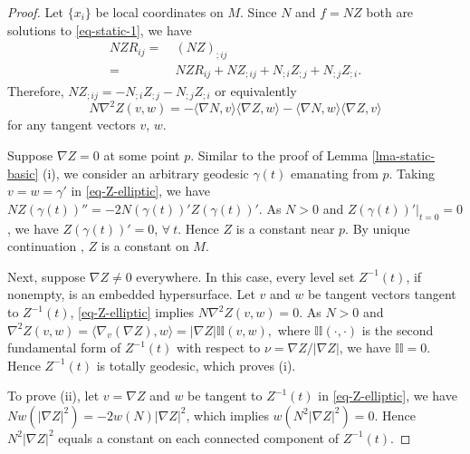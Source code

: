 \documentclass[12pt]{amsart}
\theoremstyle{remark}
\numberwithin{equation}{section}
\newcommand{\be}{\begin{equation}}
\newcommand{\ee}{\end{equation}}
\newcommand{\bee}{\begin{equation*}}
\newcommand{\eee}{\end{equation*}}
\def\la{\langle}
\def\ra{\rangle}
\def\lf{\left}
\def\ri{\right}
\def\Pi{\displaystyle{\mathbb{II}}}
\begin{document}
\begin{proof} Let $ \{ x_i \}$ be local coordinates on $M$.
Since $N$ and $f=NZ$ both are solutions to  \eqref{eq-static-1}, we have
\bee
\begin{split}
NZR_{ij}
=& \ (NZ)_{;ij}\\
=& \ NZR_{ij}+NZ_{;ij}+N_{;i}Z_{;j}+N_{;j}Z_{;i}.
\end{split}
\eee
Therefore,
$ NZ_{;ij}=-N_{;i}Z_{;j}-N_{;j}Z_{;i} $
or equivalently
\be  \label{eq-Z-elliptic}
N \nabla^2 Z (v, w) = - \la \nabla N, v \ra \la \nabla Z, w \ra - \la \nabla N, w \ra \la \nabla Z, v \ra
\ee
for any tangent vectors $v$, $w$.

 Suppose $\nabla Z=0$ at some point $p$. Similar to the proof of Lemma \ref{lma-static-basic} (i),
 we consider an arbitrary geodesic $\gamma(t)$ emanating from $p$.
Taking $ v = w = \gamma'$ in  \eqref{eq-Z-elliptic}, we have
 $  N  Z(\gamma(t) ) '' =  - 2 N (\gamma(t))' Z(\gamma(t))' $.
 As $N > 0 $ and $ Z(\gamma(t))' |_{t=0} = 0 $, we have  $ Z(\gamma(t))' = 0 $, $ \forall \ t $. Hence
$Z$ is a constant near $p$.  By unique continuation \cite{Aronszajn-1957}, $Z$ is  a constant on $M$.


Next, suppose $ \nabla Z \neq 0$ everywhere. In this case, every level set  $Z^{-1}(t)$, if nonempty,  is an embedded hypersurface.
Let $ v$ and $w$ be  tangent vectors tangent to $Z^{-1} (t)  $,
 \eqref{eq-Z-elliptic} implies
$
N \nabla^2 Z ( v, w)  = 0 .
$
As  $N > 0 $ and
$
\nabla^2 Z (v, w) = \la \nabla_v (\nabla Z) , w \ra  = | \nabla Z | \Pi (v, w),
$
where $ \Pi ( \cdot, \cdot) $ is the second fundamental form of $ Z^{-1}(t) $ with respect to
$ \nu = \nabla Z / | \nabla Z |$, we have $ \Pi = 0 $. Hence $ Z^{-1} (t) $ is totally geodesic, which proves (i).

To prove (ii), let  $ v = \nabla Z $ and $  w $ be  tangent to $ Z^{-1}(t)$ in  \eqref{eq-Z-elliptic}, we have
$    N w \lf( | \nabla Z |^2 \ri) = - 2 w ( {N} )  | \nabla Z |^2$,
which implies
$  w \lf( N^2 | \nabla Z |^2  \ri) = 0 . $
Hence $ N^2 | \nabla Z |^2  $ equals a constant   on each connected component of $  Z^{-1}(t)$.


\end{proof}
\end{document}
